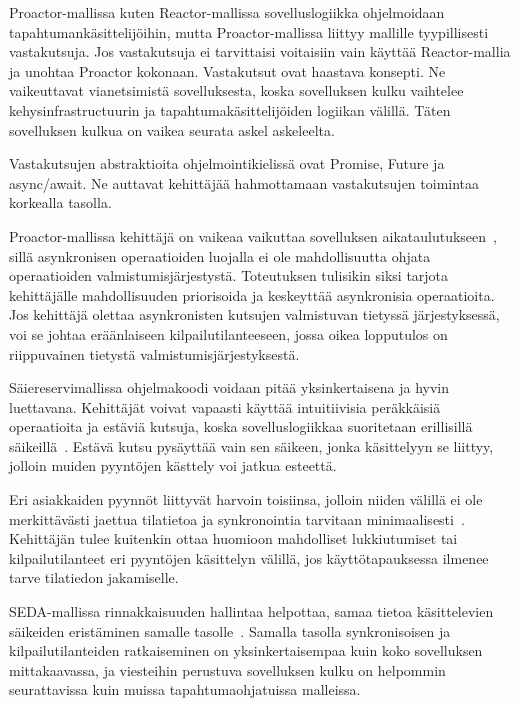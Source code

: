 \documentclass[finnish]{tktltiki2}
\theoremstyle{definition}
\theoremstyle{remark}
\begin{document}
Proactor-mallissa kuten Reactor-mallissa sovelluslogiikka ohjelmoidaan 
tapahtumankäsittelijöihin, mutta Proactor-mallissa liittyy 
mallille tyypillisesti vastakutsuja. Jos vastakutsuja ei tarvittaisi
voitaisiin vain käyttää Reactor-mallia ja unohtaa Proactor kokonaan.
Vastakutsut ovat haastava konsepti. Ne vaikeuttavat vianetsimistä
sovelluksesta, koska sovelluksen kulku vaihtelee kehysinfrastructuurin
ja tapahtumakäsittelijöiden logiikan välillä. Täten sovelluksen 
kulkua on vaikea seurata askel askeleelta.

Vastakutsujen abstraktioita ohjelmointikielissä ovat Promise, Future ja
async/await. Ne auttavat kehittäjää hahmottamaan vastakutsujen 
toimintaa korkealla tasolla.

Proactor-mallissa kehittäjä on vaikeaa vaikuttaa sovelluksen
aikataulutukseen~\cite{pyarali_proactor_1997},
sillä asynkronisen operaatioiden luojalla
ei ole mahdollisuutta ohjata operaatioiden valmistumisjärjestystä.
Toteutuksen tulisikin siksi tarjota kehittäjälle mahdollisuuden
priorisoida ja keskeyttää asynkronisia operaatioita.
Jos kehittäjä olettaa asynkronisten kutsujen valmistuvan tietyssä järjestyksessä,
voi se johtaa eräänlaiseen kilpailutilanteeseen, jossa
oikea lopputulos on riippuvainen tietystä valmistumisjärjestyksestä.

Säiereservimallissa ohjelmakoodi voidaan pitää yksinkertaisena ja
hyvin luettavana. Kehittäjät voivat vapaasti käyttää intuitiivisia
peräkkäisiä operaatioita ja estäviä kutsuja, koska sovelluslogiikkaa
suoritetaan erillisillä säikeillä~\cite{pyarali_proactor_1997}. Estävä kutsu pysäyttää vain
sen säikeen, jonka käsittelyyn se liittyy, jolloin muiden
pyyntöjen kästtely voi jatkua esteettä.

Eri asiakkaiden pyynnöt liittyvät harvoin toisiinsa,
jolloin niiden välillä ei ole merkittävästi jaettua tilatietoa ja
synkronointia tarvitaan minimaalisesti~\cite{pyarali_proactor_1997}.
Kehittäjän tulee kuitenkin ottaa huomioon mahdolliset lukkiutumiset
tai kilpailutilanteet eri pyyntöjen käsittelyn välillä, jos
käyttötapauksessa ilmenee tarve tilatiedon jakamiselle.

SEDA-mallissa rinnakkaisuuden hallintaa helpottaa,
samaa tietoa käsittelevien säikeiden eristäminen samalle tasolle~\cite{welsh_seda_2001}.
Samalla tasolla synkronisoisen ja kilpailutilanteiden ratkaiseminen on
yksinkertaisempaa kuin koko sovelluksen mittakaavassa, ja
viesteihin perustuva sovelluksen kulku on helpommin seurattavissa kuin
muissa tapahtumaohjatuissa malleissa.
\end{document}
